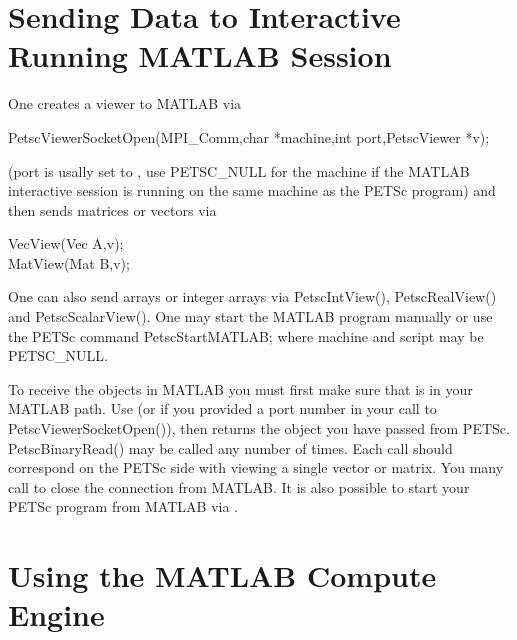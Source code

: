 \section{Sending Data to Interactive Running MATLAB Session}

One creates a viewer to MATLAB via 
\begin{tabbing}
PetscViewerSocketOpen(MPI\_Comm,char *machine,int port,PetscViewer *v);
\end{tabbing}
(port is usally set to , use PETSC_NULL for the machine if the 
MATLAB interactive session is running on the same machine as the PETSc program) 
and then sends matrices or vectors via
\begin{tabbing}
  VecView(Vec A,v);\\
  MatView(Mat B,v);
\end{tabbing}
One can also send arrays or integer arrays via PetscIntView(), PetscRealView() and PetscScalarView().
One may start the MATLAB program manually or use the PETSc command
PetscStartMATLAB; where machine and script may be PETSC_NULL.

To receive the objects in MATLAB you must first make sure that 
is in your MATLAB path. Use  (or  if you provided a port number in
your call to PetscViewerSocketOpen()), then  returns the object you have passed from PETSc.
PetscBinaryRead() may be called any number of times. Each call should correspond on the PETSc side with
viewing a single vector or matrix. You many call  to close the connection from MATLAB.
It is also possible to start your PETSc program from MATLAB via .

\section{Using the MATLAB Compute Engine}

